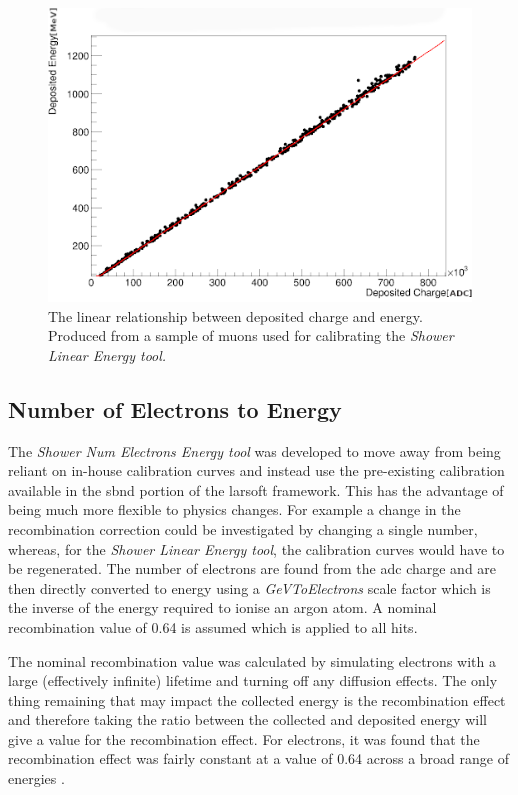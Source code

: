 \begin{figure}[h!]
    \centering
    \includegraphics[width = \largefigwidth]{figures-chap4/linear_energy_lookup_curve1.png}
    \caption{The linear relationship between deposited charge and energy. Produced from a sample of muons used for calibrating the \textit{Shower Linear Energy tool.}}
    \label{fig:linear lookup curve}
\end{figure}

\newpage

\subsection{Number of Electrons to Energy}\label{subchap:kGeVToElectrons}
The \textit{Shower Num Electrons Energy tool} was developed to move away from being reliant on in-house calibration curves and instead use the pre-existing calibration available in the \Gls{sbnd} portion of the \Gls{larsoft} framework. This has the advantage of being much more flexible to physics changes. For example a change in the recombination correction could be investigated by changing a single number, whereas, for the \textit{Shower Linear Energy tool}, the calibration curves would have to be regenerated. The number of electrons are found from the \gls{adc} charge and are then directly converted to energy using a \textit{GeVToElectrons} scale factor which is the inverse of the energy required to ionise an argon atom. A nominal recombination value of 0.64 is assumed which is applied to all hits.

The nominal recombination value was calculated by simulating electrons with a large (effectively infinite) lifetime and turning off any diffusion effects. The only thing remaining that may impact the collected energy is the recombination effect and therefore taking the ratio between the collected and deposited energy will give a value for the recombination effect. For electrons, it was found that the recombination effect was fairly constant at a value of 0.64 across a broad range of energies \cite{recombination_0.64}. 

